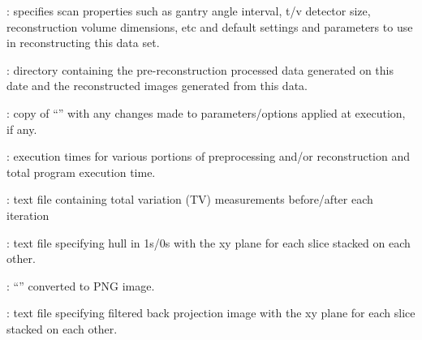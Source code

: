 \begin{tcbfunctionenv}
\begin{tcbparagraph}
\begin{deepList}[labelindent=1pt, leftmargin=*]
\begin{deepList}[labelindent=1pt, leftmargin=*]
\begin{deepList}[labelindent=1pt, leftmargin=*]
\begin{deepList}[labelindent=1pt, leftmargin=*]
\begin{deepList}[labelindent=1pt, leftmargin=*]
\begin{deepList}[labelindent=1pt, leftmargin=*]
\begin{deepList}[labelindent=1pt, leftmargin=*]
                               \begin{deepList}[labelindent=1pt, leftmargin=*]
                                    \item {} : specifies scan properties such as gantry angle interval, t/v detector size, reconstruction volume dimensions, etc and default settings and parameters to use in reconstructing this data set.
                    				\item {} : directory containing the pre-reconstruction processed data generated on this date and the reconstructed images generated from this data.
                                    \begin{deepList}[labelindent=1pt, leftmargin=*]
                                        \item {} : copy of ``'' with any changes made to parameters/options applied at execution, if any.
                                        \item {} : execution times for various portions of preprocessing and/or reconstruction and total program execution time.
                                        \item {} : text file containing total variation (TV) measurements before/after each iteration
                                        \item {} : text file specifying hull in 1s/0s with the xy plane for each slice stacked on each other.
                                        \item {} : ``'' converted to PNG image.
                                        \item {} : text file specifying filtered back projection image with the xy plane for each slice stacked on each other.

\end{deepList}
\end{deepList}
\end{deepList}
\end{deepList}
\end{deepList}
\end{deepList}
\end{deepList}
\end{deepList}
\end{deepList}
\end{tcbparagraph}
\end{tcbfunctionenv}
